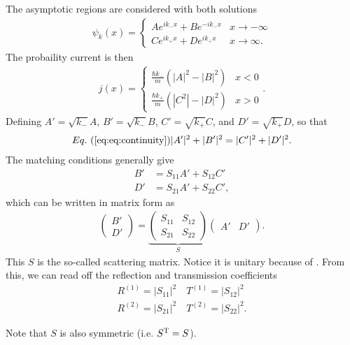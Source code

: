 The asymptotic regions are considered with both solutions
\begin{eqnarray}
    \psi_{k}(x) = \begin{cases}
        A e^{i k_{-} x} + B e^{-i k_{-} x} & x \rightarrow -\infty \\
        C e^{i k_{+} x} + D e^{i k_{+} x} & x \rightarrow \infty
    .\end{cases}
\end{eqnarray}
The probaility current is then
\begin{eqnarray}
    j(x) = \begin{cases}
        \frac{\hbar k_{-}}{m} (|A|^2 - |B|^2) & x < 0 \\
        \frac{\hbar k_{+}}{m} (|C^2| - |D|^2) & x > 0
    \end{cases}
.\end{eqnarray}
Defining $A' = \sqrt{k_{-}} A$, $B' = \sqrt{k_{-}} B$, $C' = \sqrt{k_{+}} C$, and $D' = \sqrt{k_{+}} D$, so that
\begin{eqnarray}
    \eref{eq:continuity}
    |A'|^2 + |B'|^2 = |C'|^2 + |D'|^2
.\end{eqnarray}
The matching conditions generally give
\begin{align}
    B' &= S_{11} A' + S_{12} C' \\
    D' &= S_{21} A' + S_{22} C'
,\end{align}
which can be written in matrix form as
\begin{eqnarray}
    \begin{pmatrix}
    B' \\ D'
    \end{pmatrix}
    =
    \underbrace{
    \begin{pmatrix}
        S_{11} & S_{12} \\ S_{21} & S_{22}
    \end{pmatrix}
}_{S}
    \begin{pmatrix}
        A' & D'
    \end{pmatrix} 
.\end{eqnarray}
This $S$ is the so-called scattering matrix.
Notice it is unitary because of .
From this, we can read off the reflection and transmission coefficients
\begin{align}
    R^{(1)} = |S_{11}|^2 \quad T^{(1)} = |S_{12}|^2 \\
    R^{(2)} = |S_{21}|^2 \quad T^{(2)} = |S_{22}|^2
.\end{align}

Note that $S$ is also symmetric (i.e. $S^{\rm T} = S$).





